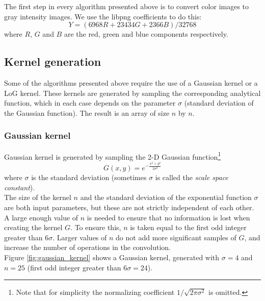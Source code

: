 \documentclass{ipol}
\numberwithin{equation}{section}
\numberwithin{table}{section}
\numberwithin{figure}{section}
\begin{document}
The first step in every algorithm presented above is to convert color images to gray intensity images. 
We use the libpng coefficients to do this:
\begin{equation}
    Y = (6968 R + 23434 G + 2366 B) / 32768
\end{equation}
where $R$, $G$ and $B$ are the red, green and blue components respectively.


\subsection{Kernel generation}

Some of the algorithms presented above require the use of a Gaussian kernel or a LoG kernel. These 
kernels are generated by sampling the corresponding analytical function, which in each case depends 
on the parameter $\sigma$ (standard deviation of the Gaussian function). The result is an array of 
size $n$ by $n$.


\subsubsection{Gaussian kernel}

Gaussian kernel is generated by sampling the 2-D Gaussian function\footnote{Note that for simplicity
the normalizing coefficient $1/\sqrt{2\pi\sigma^2}$ is omitted.}
\begin{equation}
	\label{eq:gaussian_function}
	G(x,y) = e^{-\frac{x^2+y^2}{2\sigma^2}}
\end{equation}
where $\sigma$ is the standard deviation (sometimes $\sigma$ is called the \textit{scale space constant}).\\

The size of the kernel $n$ and the standard deviation of the exponential function $\sigma$ are both 
input parameters, but these are not strictly independent of each other. 
A large enough value of $n$ is needed to ensure that no information is lost when creating the kernel $G$. To ensure this, $n$ is taken equal to the first odd integer greater than $6\sigma$. Larger values of $n$ do not add more significant samples ​​of $G$, and increase the number of operations in the convolution.\\

Figure \ref{fig:gaussian_kernel} shows a Gaussian kernel, generated with $\sigma = 4$ and $n = 25$ 
(first odd integer greater than $6\sigma=24$).
\end{document}
